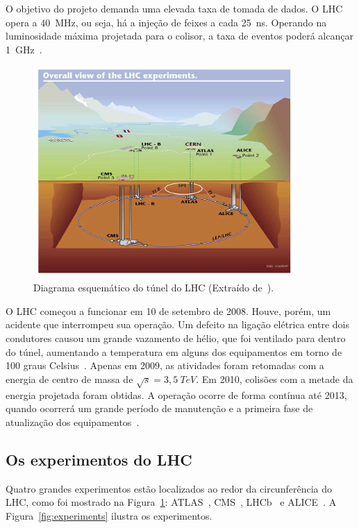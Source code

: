 O objetivo do projeto demanda uma elevada taxa de tomada de dados. O LHC opera a
40~MHz, ou seja, há a injeção de feixes a cada 25~ns. Operando na luminosidade
máxima projetada para o colisor, a taxa de eventos poderá alcançar
1~GHz~\cite{EVANS2008}.

\begin{figure}[htpb!]
    \centering
    \includegraphics[width=10cm]{images/lhc-sim.png}
    \caption[Diagrama esquemático do túnel do LHC.]{Diagrama esquemático do
    túnel do LHC (Extraído de~\cite{ref:cern_www}).}
    \label{fig:lhc}
\end{figure}

O LHC começou a funcionar em 10 de setembro de 2008. Houve, porém, um acidente
que interrompeu sua operação. Um defeito na ligação elétrica entre dois
condutores causou um grande vazamento de hélio, que foi ventilado para dentro
do túnel, aumentando a temperatura em alguns dos equipamentos em torno de 100
graus Celsius~\cite{NATURE2008}. Apenas em 2009, as atividades foram
retomadas com a energia de centro de massa de $\sqrt{s} = 3,5~TeV$. Em
2010, colisões com a metade da energia projetada foram obtidas. A operação
ocorre de forma contínua até 2013, quando ocorrerá um grande período de
manutenção e a primeira fase de atualização dos
equipamentos~\cite{ref:ANDERSON2011}.

\subsection{Os experimentos do LHC}

Quatro grandes experimentos estão localizados ao redor da circunferência do LHC,
como foi mostrado na Figura~\ref{fig:lhc}: ATLAS~\cite{ATLAS2008, ref:BOELAERT2012},
CMS~\cite{ref:CMS}, LHCb~\cite{ref:SZUMLAK2010} e ALICE~\cite{ref:ALICE2008}. A
Figura~\ref{fig:experiments} ilustra os experimentos.


